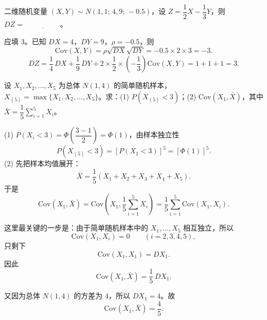 ﻿\documentclass[lang=cn,11pt]{elegantbook}
\begin{document}
\begin{exercise}\label{exer:4-bvn-dz}
二维随机变量 \((X,Y) \sim N(1,1;\,4,9;\,-0.5)\)，设 \(Z = \dfrac{1}{2}X - \dfrac{1}{3}Y\)，则 \(DZ =\,\underline{\hspace{2cm}}\)。
\end{exercise}
\begin{solution}
应填 3。已知 \(DX = 4\)，\(DY = 9\)，\(\rho = -0.5\)，则
\[
\mathrm{Cov}(X,Y) = \rho\sqrt{DX}\sqrt{DY} = -0.5 \times 2 \times 3 = -3.
\]
\[
DZ = \frac{1}{4}\,DX + \frac{1}{9}\,DY + 2 \times \frac{1}{2} \times \left(-\frac{1}{3}\right) \mathrm{Cov}(X,Y)
= 1 + 1 + 1 = 3.
\]
\end{solution}

\begin{exercise}\label{exer:4-sample-cov}
设 \(X_1, X_2, \dots, X_5\) 为总体 \(N(1,4)\) 的简单随机样本，\(X_{(5)} = \max\{X_1, X_2, \dots, X_5\}\)。求：(1) \(P(X_{(5)} < 3)\)；(2) \(\mathrm{Cov}(X_1, \bar{X})\)，其中 \(\bar{X} = \dfrac{1}{5}\sum\limits_{i=1}^{5}X_i\)。
\end{exercise}
\begin{solution}
(1) \(P(X_i < 3) = \Phi\!\left(\dfrac{3-1}{2}\right) = \Phi(1)\)，由样本独立性
\[
P(X_{(5)} < 3) = [P(X_1 < 3)]^5 = [\Phi(1)]^5.
\]
(2) 先把样本均值展开：
\[
\bar X=\frac15(X_1+X_2+X_3+X_4+X_5).
\]
于是
\[
\mathrm{Cov}(X_1,\bar X)
=\mathrm{Cov}\!\left(X_1,\frac15\sum_{i=1}^{5}X_i\right)
=\frac15\sum_{i=1}^{5}\mathrm{Cov}(X_1,X_i).
\]

这里最关键的一步是：由于简单随机样本中的 \(X_1,\dots,X_5\) 相互独立，所以
\[
\mathrm{Cov}(X_1,X_i)=0\qquad (i=2,3,4,5),
\]
只剩下
\[
\mathrm{Cov}(X_1,X_1)=DX_1.
\]
因此
\[
\mathrm{Cov}(X_1,\bar X)=\frac15\,DX_1.
\]

又因为总体 \(N(1,4)\) 的方差为 4，所以 \(DX_1=4\)。故
\[
\mathrm{Cov}(X_1,\bar X)=\frac45.
\]
\end{solution}
\end{document}
